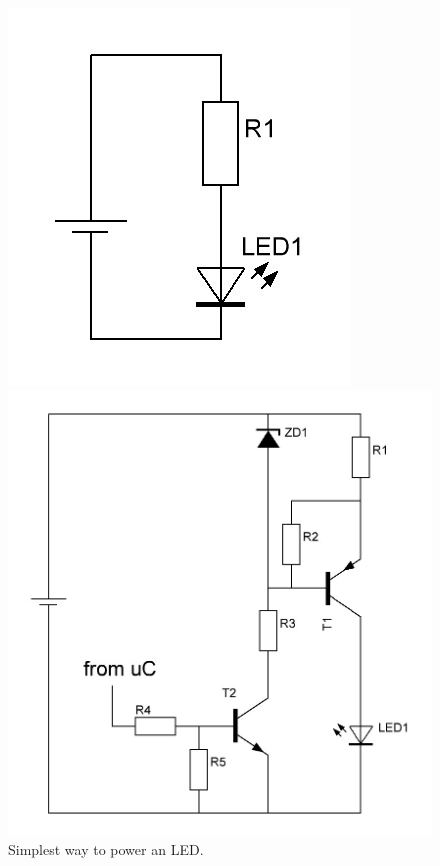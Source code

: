 	\begin{figure}[!h]
		\centering
		\begin{minipage}[b]{0.3\textwidth}
			\includegraphics[width=\textwidth]{chapters/hardware-chapters/DC/dc-modulator/dc-led-resistor.jpg}
			\caption{Simplest way to power an LED.}
			\label{fig:dc-led-resistor}
		\end{minipage}
		\hfill
		\begin{minipage}[b]{0.5\textwidth}
			\includegraphics[width=\textwidth]{chapters/hardware-chapters/DC/dc-modulator/dc-led-current-source.jpg}

\end{minipage}
\end{figure}
